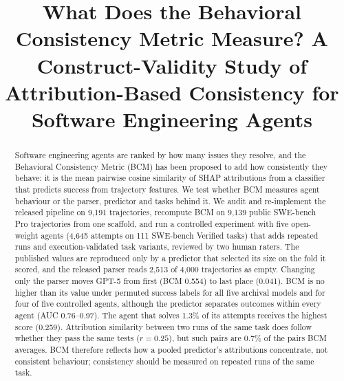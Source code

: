 \documentclass[conference]{IEEEtran}
\newcommand{\bcm}{\textsc{BCM}}
\begin{document}
\title{What Does the Behavioral Consistency Metric Measure? A Construct-Validity Study of Attribution-Based Consistency for Software Engineering Agents}

\author{\IEEEauthorblockN{[Author 1]}
\IEEEauthorblockA{[Affiliation]\\
\relax [email]}
\and
\IEEEauthorblockN{[Author 2]}
\IEEEauthorblockA{[Affiliation]\\
\relax [email]}
\and
\IEEEauthorblockN{[Author 3]}
\IEEEauthorblockA{[Affiliation]\\
\relax [email]}
\and
\IEEEauthorblockN{[Author 4]}
\IEEEauthorblockA{[Affiliation]\\
\relax [email]}}

\maketitle

\begin{abstract}
Software engineering agents are ranked by how many issues they resolve, and the Behavioral Consistency Metric (\bcm) has been proposed to add how consistently they behave: it is the mean pairwise cosine similarity of SHAP attributions from a classifier that predicts success from trajectory features. We test whether \bcm{} measures agent behaviour or the parser, predictor and tasks behind it. We audit and re-implement the released pipeline on 9{,}191 trajectories, recompute \bcm{} on 9{,}139 public SWE-bench Pro trajectories from one scaffold, and run a controlled experiment with five open-weight agents (4{,}645 attempts on 111 SWE-bench Verified tasks) that adds repeated runs and execution-validated task variants, reviewed by two human raters. The published values are reproduced only by a predictor that selected its size on the fold it scored, and the released parser reads 2{,}513 of 4{,}000 trajectories as empty. Changing only the parser moves GPT-5 from first (\bcm{} 0.554) to last place (0.041). \bcm{} is no higher than its value under permuted success labels for all five archival models and for four of five controlled agents, although the predictor separates outcomes within every agent (AUC 0.76--0.97). The agent that solves 1.3\% of its attempts receives the highest score (0.259). Attribution similarity between two runs of the same task does follow whether they pass the same tests ($r=0.25$), but such pairs are 0.7\% of the pairs \bcm{} averages. \bcm{} therefore reflects how a pooled predictor's attributions concentrate, not consistent behaviour; consistency should be measured on repeated runs of the same task.
\end{abstract}
\end{document}
